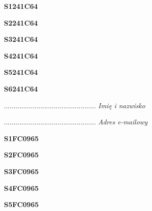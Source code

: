 \begin{turn}{90}\huge \textbf{S1241C64}\end{turn}

\begin{turn}{90}\huge \textbf{S2241C64}\end{turn}

\begin{turn}{90}\huge \textbf{S3241C64}\end{turn}

\begin{turn}{90}\huge \textbf{S4241C64}\end{turn}

\begin{turn}{90}\huge \textbf{S5241C64}\end{turn}

\begin{turn}{90}\huge \textbf{S6241C64}\end{turn}

\begin{turn}{90}\begin{minipage}{\linewidth} \vspace{20mm} ................................................  \textit{Imię i nazwisko}\end{minipage}\end{turn}

\begin{turn}{90}\begin{minipage}{\linewidth} \vspace{20mm} ................................................  \textit{Adres e-mailowy}\end{minipage}\end{turn}

\begin{turn}{90}\huge \textbf{S1FC0965}\end{turn}

\begin{turn}{90}\huge \textbf{S2FC0965}\end{turn}

\begin{turn}{90}\huge \textbf{S3FC0965}\end{turn}

\begin{turn}{90}\huge \textbf{S4FC0965}\end{turn}

\begin{turn}{90}\huge \textbf{S5FC0965}\end{turn}

